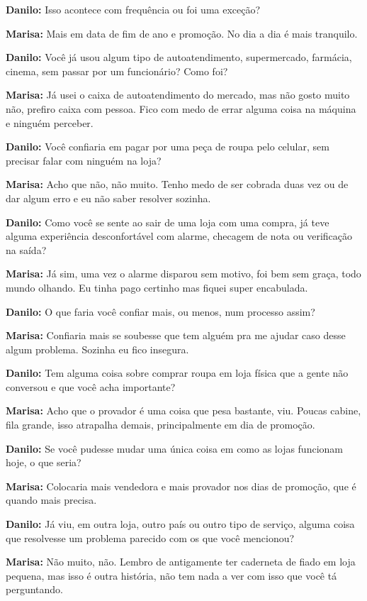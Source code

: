 \textbf{Danilo:} Isso acontece com frequência ou foi uma exceção?

\textbf{Marisa:} Mais em data de fim de ano e promoção. No dia a dia é mais tranquilo.

\textbf{Danilo:} Você já usou algum tipo de autoatendimento, supermercado, farmácia, cinema, sem passar por um funcionário? Como foi?

\textbf{Marisa:} Já usei o caixa de autoatendimento do mercado, mas não gosto muito não, prefiro caixa com pessoa. Fico com medo de errar alguma coisa na máquina e ninguém perceber.

\textbf{Danilo:} Você confiaria em pagar por uma peça de roupa pelo celular, sem precisar falar com ninguém na loja?

\textbf{Marisa:} Acho que não, não muito. Tenho medo de ser cobrada duas vez ou de dar algum erro e eu não saber resolver sozinha.

\textbf{Danilo:} Como você se sente ao sair de uma loja com uma compra, já teve alguma experiência desconfortável com alarme, checagem de nota ou verificação na saída?

\textbf{Marisa:} Já sim, uma vez o alarme disparou sem motivo, foi bem sem graça, todo mundo olhando. Eu tinha pago certinho mas fiquei super encabulada.

\textbf{Danilo:} O que faria você confiar mais, ou menos, num processo assim?

\textbf{Marisa:} Confiaria mais se soubesse que tem alguém pra me ajudar caso desse algum problema. Sozinha eu fico insegura.

\textbf{Danilo:} Tem alguma coisa sobre comprar roupa em loja física que a gente não conversou e que você acha importante?

\textbf{Marisa:} Acho que o provador é uma coisa que pesa bastante, viu. Poucas cabine, fila grande, isso atrapalha demais, principalmente em dia de promoção.

\textbf{Danilo:} Se você pudesse mudar uma única coisa em como as lojas funcionam hoje, o que seria?

\textbf{Marisa:} Colocaria mais vendedora e mais provador nos dias de promoção, que é quando mais precisa.

\textbf{Danilo:} Já viu, em outra loja, outro país ou outro tipo de serviço, alguma coisa que resolvesse um problema parecido com os que você mencionou?

\textbf{Marisa:} Não muito, não. Lembro de antigamente ter caderneta de fiado em loja pequena, mas isso é outra história, não tem nada a ver com isso que você tá perguntando.

